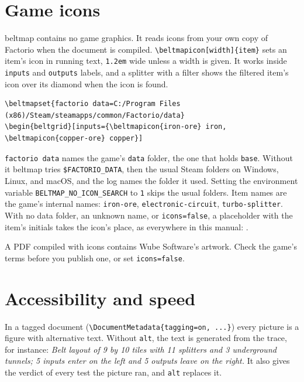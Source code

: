 \documentclass[11pt]{article}
\newcommand\key[1]{\texttt{#1}}
\begin{document}
	\begin{center}
	\end{center}

	\section{Game icons}
	\label{sec:icons}

	\textsf{beltmap} contains no game graphics. It reads icons from your own copy of Factorio when the document is compiled. \verb|\beltmapicon[width]{item}| sets an item's icon in running text, \verb|1.2em| wide unless a width is given. It works inside \key{inputs} and \key{outputs} labels, and a splitter with a filter shows the filtered item's icon over its diamond when the icon is found.

	\begin{Verbatim}
\beltmapset{factorio data=C:/Program Files (x86)/Steam/steamapps/common/Factorio/data}
\begin{beltgrid}[inputs={\beltmapicon{iron-ore} iron, \beltmapicon{copper-ore} copper}]
	\end{Verbatim}

	\key{factorio data} names the game's \texttt{data} folder, the one that holds \texttt{base}. Without it \textsf{beltmap} tries \texttt{\$FACTORIO\_DATA}, then the usual Steam folders on Windows, Linux, and macOS, and the log names the folder it used. Setting the environment variable \texttt{BELTMAP\_NO\_ICON\_SEARCH} to \texttt{1} skips the usual folders. Item names are the game's internal names: \texttt{iron-ore}, \texttt{electronic-circuit}, \texttt{turbo-splitter}. With no data folder, an unknown name, or \key{icons=false}, a placeholder with the item's initials takes the icon's place, as everywhere in this manual:  .

	A PDF compiled with icons contains Wube Software's artwork. Check the game's terms before you publish one, or set \key{icons=false}.

	\section{Accessibility and speed}

	In a tagged document (\verb|\DocumentMetadata{tagging=on, ...}|) every picture is a figure with alternative text. Without \key{alt}, the text is generated from the trace, for instance: \emph{Belt layout of 9 by 10 tiles with 11 splitters and 3 underground tunnels; 5 inputs enter on the left and 5 outputs leave on the right.} It also gives the verdict of every test the picture ran, and \key{alt} replaces it.
\end{document}
